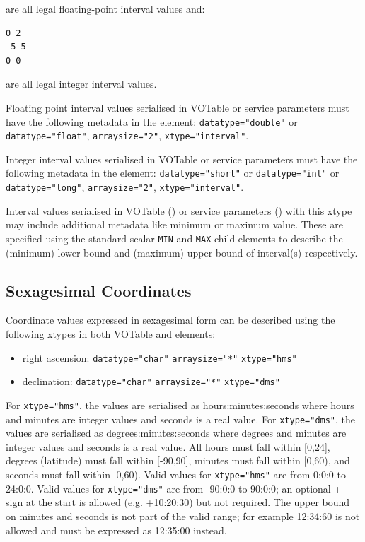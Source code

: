 \documentclass[11pt,letter]{ivoa}
\begin{document}
\noindent are all legal floating-point interval values and:

\begin{verbatim}
0 2
-5 5
0 0
\end{verbatim}

\noindent are all legal integer interval values.

Floating point interval values serialised in VOTable or service parameters must have the following metadata in the
 element: \verb|datatype="double"| or \verb|datatype="float"|,
\verb|arraysize="2"|, \verb|xtype="interval"|.

Integer interval values serialised in VOTable or service parameters must have the following metadata in the
 element: \verb|datatype="short"| or \verb|datatype="int"| or
\verb|datatype="long"|, \verb|arraysize="2"|, \verb|xtype="interval"|.

Interval values serialised in VOTable () or service parameters
() with this xtype may include additional metadata like minimum
or maximum value. These are specified using the standard scalar \verb|MIN| and
\verb|MAX| child elements to describe the (minimum) lower bound and (maximum)
upper bound of interval(s) respectively.

\subsection{Sexagesimal Coordinates}
Coordinate values expressed in sexagesimal form can be described using the following
xtypes in both VOTable  and  elements:

\begin{itemize}
\item right ascension: \verb|datatype="char"| \verb|arraysize="*"| \verb|xtype="hms"|
\item declination: \verb|datatype="char"| \verb|arraysize="*"| \verb|xtype="dms"|
\end{itemize}

For \verb|xtype="hms"|, the values are serialised as hours:minutes:seconds where hours
and minutes are integer values and seconds is a real value. For \verb|xtype="dms"|, the values
are serialised as degrees:minutes:seconds where degrees and minutes are integer
values and seconds is a real value. All hours must fall within [0,24], degrees
(latitude) must fall within [-90,90], minutes must fall within [0,60), and seconds
must fall within [0,60). Valid values for \verb|xtype="hms"| are from 0:0:0 to 24:0:0.
Valid values for \verb|xtype="dms"| are from -90:0:0 to 90:0:0; an optional + sign at
the start is allowed (e.g. +10:20:30) but not required. The upper bound on minutes 
and seconds is not part of the valid range; for example 12:34:60 is not allowed and must 
be expressed as 12:35:00 instead.
\end{document}
